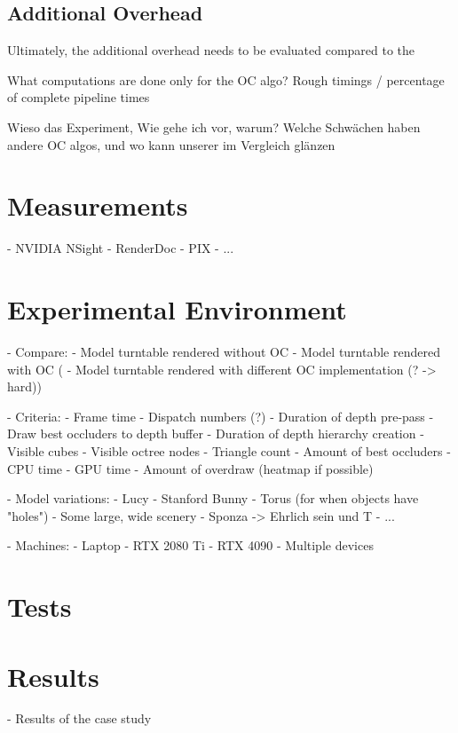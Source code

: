 \subsection*{Additional Overhead}

Ultimately, the additional overhead needs to be evaluated compared to the 

What computations are done only for the OC algo?
Rough timings / percentage of complete pipeline times



Wieso das Experiment,
Wie gehe ich vor, warum?
Welche Schwächen haben andere OC algos, und wo kann unserer im Vergleich glänzen



\section{Measurements}

- NVIDIA NSight
- RenderDoc
- PIX
- ...

\section{Experimental Environment} \label{sec-experimental-environment}

- Compare:
    - Model turntable rendered without OC
    - Model turntable rendered with OC
(   - Model turntable rendered with different OC implementation (? -> hard))


- Criteria: 
    - Frame time
    - Dispatch numbers (?)
    - Duration of depth pre-pass
        - Draw best occluders to depth buffer
        - Duration of depth hierarchy creation
    - Visible cubes
    - Visible octree nodes
    - Triangle count
    - Amount of best occluders
    - CPU time
    - GPU time
    - Amount of overdraw (heatmap if possible)


- Model variations:
    - Lucy
    - Stanford Bunny
    - Torus (for when objects have "holes")
    - Some large, wide scenery
    - Sponza        -> Ehrlich sein und T
    - ...


- Machines:
    - Laptop
    - RTX 2080 Ti
    - RTX 4090
    - Multiple devices


\section{Tests}




\section{Results}

- Results of the case study


